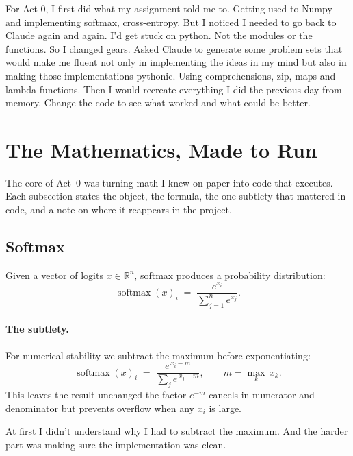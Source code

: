 \documentclass[11pt,a4paper]{article}
\newcommand{\R}{\mathbb{R}}
\DeclareMathOperator{\Softmax}{softmax}
\begin{document}
For Act-0, I first did what my assignment told me to. Getting used to Numpy and implementing softmax, cross-entropy. But I noticed I needed to go back to Claude again and again. I'd get stuck on python. Not the modules or the functions. So I changed gears. Asked Claude to generate some problem sets that would make me fluent not only in implementing the ideas in my mind but also in making those implementations pythonic. Using comprehensions, zip, maps and lambda functions. Then I would recreate everything I did the previous day from memory. Change the code to see what worked and what could be better.

\section{The Mathematics, Made to Run}
\label{sec:mathematics}

The core of Act~0 was turning math I knew on paper into code that
executes.
Each subsection states the object, the formula, the one subtlety that
mattered in code, and a note on where it reappears in the project.

\subsection{Softmax}
\label{subsec:softmax}

Given a vector of logits $x \in \R^{n}$, softmax produces a probability
distribution:
\[
  \Softmax(x)_{i} \;=\; \frac{e^{x_{i}}}{\displaystyle\sum_{j=1}^{n} e^{x_{j}}}.
\]

\paragraph{The subtlety.}
For numerical stability we subtract the maximum before exponentiating:
\[
  \Softmax(x)_{i} \;=\;
  \frac{e^{\,x_{i} - m}}{\displaystyle\sum_{j} e^{\,x_{j} - m}},
  \qquad m = \max_{k}\, x_{k}.
\]
This leaves the result unchanged \textemdash{} the factor $e^{-m}$ cancels in
numerator and denominator \textemdash{} but prevents overflow when any $x_{i}$ is large.

At first I didn't understand why I had to subtract the maximum. And the harder part was making sure the implementation was clean.
\end{document}
